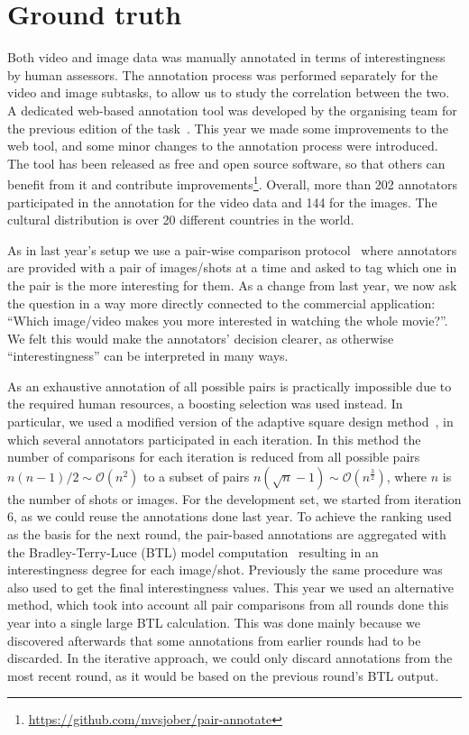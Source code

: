 \documentclass[sigconf]{acmart-me}
\begin{document}
\section{Ground truth}

Both video and image data was manually annotated in terms of interestingness by human assessors.
The annotation process was performed separately for the video and image subtasks, to allow us to study the correlation between the two.
A dedicated web-based annotation tool was developed by the organising team for the previous edition of the task~\cite{demarty2016mediaeval}.
This year we made some improvements to the web tool, and some minor changes to the annotation process were introduced.
The tool has been released as free and open source software, so that others can benefit from it and contribute
improvements\footnote{\url{https://github.com/mvsjober/pair-annotate}}.
Overall, more than 202 annotators participated in the annotation for the video data and 144 for the images.
The cultural distribution is over 20 different countries in the world.


As in last year's setup we use a pair-wise comparison protocol~\cite{Bradley} where annotators are provided with a pair of images/shots at a time and asked to tag which one in the pair is the more interesting for them.
As a change from last year, we now ask the question in a way more directly connected to the commercial application: ``Which image/video makes you more interested in watching the whole movie?''.
We felt this would make the annotators' decision clearer, as otherwise ``interestingness'' can be interpreted in many ways.


As an exhaustive annotation of all possible pairs is practically impossible due to the required human resources, a boosting selection was used instead.
In particular, we used a modified version of the adaptive square design method~\cite{Li-SPIE2013}, in which several annotators participated in each iteration.  
In this method the number of comparisons for each iteration is reduced from all possible pairs $n(n-1)/2 \sim \mathcal{O}(n^2)$ to a subset of pairs $n(\sqrt{n}-1) \sim \mathcal{O}(n^{\frac{3}{2}})$, where $n$ is the number of shots or images.
For the development set, we started from iteration 6, as we could reuse the annotations done last year.
To achieve the ranking used as the basis for the next round, the pair-based annotations are aggregated with the Bradley-Terry-Luce (BTL) model computation~\cite{Bradley} resulting in an interestingness degree for each image/shot.
Previously the same procedure was also used to get the final interestingness values.
This year we used an alternative method, which took into account all pair comparisons from all rounds done this year into a single large BTL calculation.
This was done mainly because we discovered afterwards that some annotations from earlier rounds had to be discarded. 
In the iterative approach, we could only discard annotations from the most recent round, as it would be based on the previous round's BTL output.
\end{document}
